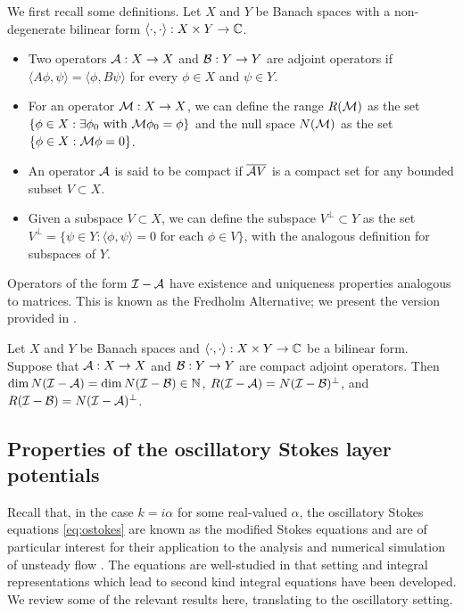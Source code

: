 We first recall some definitions.
Let $X$ and $Y$ be Banach spaces with a non-degenerate
bilinear form $\langle \cdot ,\cdot \rangle: X\times Y \to \mathbb{C}$.
\begin{itemize}
\item Two operators ${\mathcal A}:X\to X$ and ${\mathcal B}:Y\to Y$ are
adjoint operators if
$\langle A \phi,\psi \rangle = \langle \phi, B\psi \rangle$
for every $\phi \in X$ and $\psi \in Y$.
\item For an operator ${\mathcal M}:X\to X$, we can define the range
  $R({\mathcal M})$ as the set $\{\phi \in X: \exists \phi_0 \textrm{ with }
  {\mathcal M}\phi_0 = \phi\}$ and the null space $N({\mathcal M})$ as the
  set $\{\phi \in X: {\mathcal M} \phi = 0 \}$.
\item An operator ${\mathcal A}$ is said to be compact if
  $\overline{{\mathcal A} V}$ is a compact set for any
  bounded subset $V\subset X$.
\item Given a subspace $V\subset X$,
  we can define the subspace $V^\perp\subset Y$ as the
  set $V^\perp = \{ \psi \in Y: \langle \phi,\psi \rangle = 0
  \textrm{ for each } \phi \in V \}$, with the analogous
  definition for subspaces of $Y$.
\end{itemize}

Operators of the form $\mathcal I-{\mathcal A}$
have existence and uniqueness properties analogous to
matrices. This is known as the Fredholm Alternative;
we present the version provided in \cite{colton1983integral}.

\begin{thrm}
  Let $X$ and $Y$ be Banach spaces and
  $\langle \cdot,\cdot \rangle: X\times Y \to \mathbb{C}$ be
  a bilinear form. Suppose that ${\mathcal A}: X\to X$ and
  ${\mathcal B}:Y \to Y$ are compact adjoint operators. Then
  $\dim N(\mathcal I-{\mathcal A}) = \dim N(\mathcal I-{\mathcal B}) \in \mathbb{N}$,
  $R(\mathcal I-{\mathcal A}) = N(\mathcal I-{\mathcal B})^{\perp}$, and
  $R(\mathcal I-{\mathcal B}) = N(\mathcal I-{\mathcal A})^\perp$.
\end{thrm}

\subsection{Properties of the oscillatory Stokes layer
  potentials}

Recall that, in the case $k=i\alpha$ for some real-valued $\alpha$,
the oscillatory Stokes equations \cref{eq:ostokes}
are known as the modified Stokes equations and are of particular
interest for their application to the analysis and numerical
simulation of unsteady flow
\cite{Pozrikidis1992,biros2002embedded,
  jiang2013second,ladyzhenskaya1969mathematical}.
The equations are well-studied in that setting and
integral representations which lead to second kind
integral equations have been developed. We review
some of the relevant results here, translating to
the oscillatory setting.

